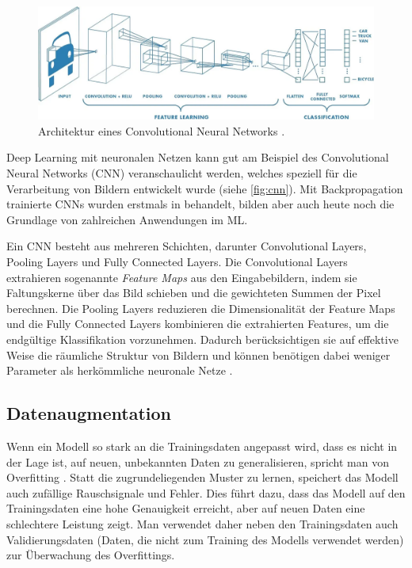 \begin{figure}[t]
	\centering
	\includegraphics[width=\textwidth]{figure_cnn.png}
	\caption[Architektur eines Convolutional Neural Networks.]{Architektur eines Convolutional Neural Networks \parencite{Saha2018cnnfigure}.}
	\label{fig:cnn}
\end{figure}

Deep Learning mit neuronalen Netzen kann gut am Beispiel des Convolutional Neural Networks (CNN) veranschaulicht werden, welches speziell für die Verarbeitung von Bildern entwickelt wurde (siehe \autoref{fig:cnn}). Mit Backpropagation trainierte CNNs wurden erstmals in \parencite{LeCun1989cnnbackprop} behandelt, bilden aber auch heute noch die Grundlage von zahlreichen Anwendungen im ML.

Ein CNN besteht aus mehreren Schichten, darunter Convolutional Layers, Pooling Layers und Fully Connected Layers. Die Convolutional Layers extrahieren sogenannte \emph{Feature Maps} aus den Eingabebildern, indem sie Faltungskerne über das Bild schieben und die gewichteten Summen der Pixel berechnen. Die Pooling Layers reduzieren die Dimensionalität der Feature Maps und die Fully Connected Layers kombinieren die extrahierten Features, um die endgültige Klassifikation vorzunehmen. Dadurch berücksichtigen sie auf effektive Weise die räumliche Struktur von Bildern und können benötigen dabei weniger Parameter als herkömmliche neuronale Netze \parencite{Goodfellow2016deeplearning}.

\subsection{Datenaugmentation} \label{subsec:data-augmentation}

Wenn ein Modell so stark an die Trainingsdaten angepasst wird, dass es nicht in der Lage ist, auf neuen, unbekannten Daten zu generalisieren, spricht man von Overfitting \parencite{Goodfellow2016deeplearning}. Statt die zugrundeliegenden Muster zu lernen, speichert das Modell auch zufällige Rauschsignale und Fehler. Dies führt dazu, dass das Modell auf den Trainingsdaten eine hohe Genauigkeit erreicht, aber auf neuen Daten eine schlechtere Leistung zeigt. Man verwendet daher neben den Trainingsdaten auch Validierungsdaten (Daten, die nicht zum Training des Modells verwendet werden) zur Überwachung des Overfittings.


